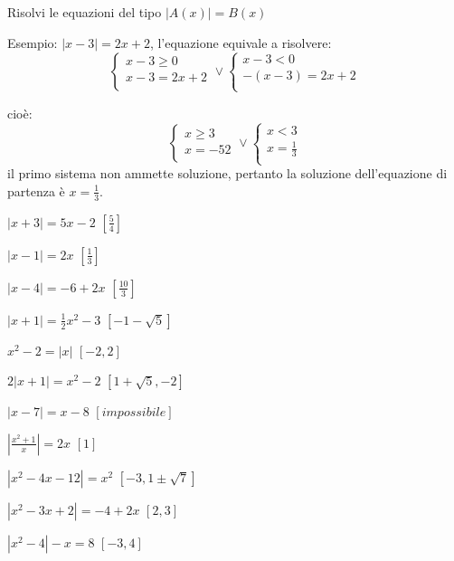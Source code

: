 \begin{esercizio}\label{ese:03.1}
\noindent Risolvi le equazioni del tipo $|A(x)|=B(x)$

Esempio:
$|x-3|=2x+2$, l'equazione equivale a risolvere:
$$
\left\lbrace 
\begin{array}{l}
x-3\geq 0 \\
x-3=2x+2\\
\end{array}
\right.
\vee
\left\lbrace 
\begin{array}{l}
x-3< 0 \\
-(x-3)=2x+2\\
\end{array}
\right.
$$      

cioè:
$$
\left\lbrace 
\begin{array}{l}
x\geq 3 \\
x=-52\\
\end{array}
\right.
\vee
\left\lbrace 
\begin{array}{l}
x< 3 \\
x=\frac{1}{3}\\
\end{array}
\right.
$$
il primo sistema non ammette soluzione, pertanto la soluzione dell'equazione di 
partenza è $    x=\frac{1}{3}$.
\begin{multicols}{2}
\begin{enumeratea}
\item $\left| x+3 \right| =5x-2 $ \hfill $\left[ \frac{5}{4}\right] $
\item $\left| x-1 \right| =2x $ \hfill $\left[ \frac{1}{3}\right] $
\item $\left| x-4 \right| =-6+2x $ \hfill $\left[ \frac{10}{3}\right] $
\item $\left| x+1 \right| =\frac{1}{2}x^2-3 $ \hfill $\left[ -1-\sqrt{5}\right] 
$
\item $x^2-2= \left| x \right| $ \hfill $\left[ -2, 2\right] $
\item $2\left| x+1 \right| =x^2-2 $ \hfill $\left[1+\sqrt{5}, -2\right] $
\item $\left| x-7 \right| =x-8 $ \hfill $\left[ impossibile\right] $
\item $\left| \frac{x^2+1}{x} \right| =2x $ \hfill $\left[ 1 \right] $
\item $\left| x^2-4x-12 \right| =x^2 $ \hfill $\left[ -3, 1\pm \sqrt{7}\right] $
\item $\left| x^2-3x+2 \right| =-4+2x $ \hfill $\left[ 2, 3\right] $
\item $\left| x^2-4 \right| -x=8 $ \hfill $\left[ -3, 4\right] $
\end{enumeratea}
\end{multicols}
\end{esercizio}

